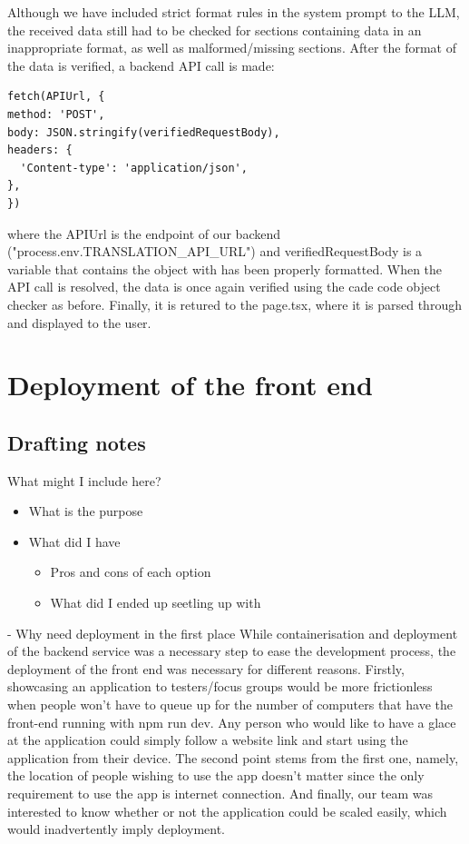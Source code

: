 Although we have included strict format rules in the system prompt to the LLM, the received data still had to be checked for sections containing data in an inappropriate format, as well as malformed/missing sections. After the format of the data is verified, a backend API call is made:
\begin{verbatim} 
fetch(APIUrl, {
method: 'POST',
body: JSON.stringify(verifiedRequestBody),
headers: {
  'Content-type': 'application/json',
},
})
\end{verbatim}
where the APIUrl is the endpoint of our backend ("process.env.TRANSLATION\_API\_URL") and verifiedRequestBody is a variable that contains the object with has been properly formatted. When the API call is resolved, the data is once again verified using the cade code object checker as before. Finally, it is retured to the page.tsx, where it is parsed through and displayed to the user. 

\section{Deployment of the front end}
\subsection{Drafting notes}
What might I include here?
\begin{itemize}
    \item What is the purpose
    \item What did I have
    \begin{itemize}
        \item Pros and cons of each option
        \item What did I ended up seetling up with
    \end{itemize}
\end{itemize}

- Why need deployment in the first place
While containerisation and deployment of the backend service was a necessary step to ease the development process, the deployment of the front end was necessary for different reasons. Firstly, showcasing an application to testers/focus groups would be more frictionless when people won't have to queue up for the number of computers that have the front-end running with npm run dev. Any person who would like to have a glace at the application could simply follow a website link and start using the application from their device. The second point stems from the first one, namely, the location of people wishing to use the app doesn't matter since the only requirement to use the app is internet connection. And finally, our team was interested to know whether or not the application could be scaled easily, which would inadvertently imply deployment. 

